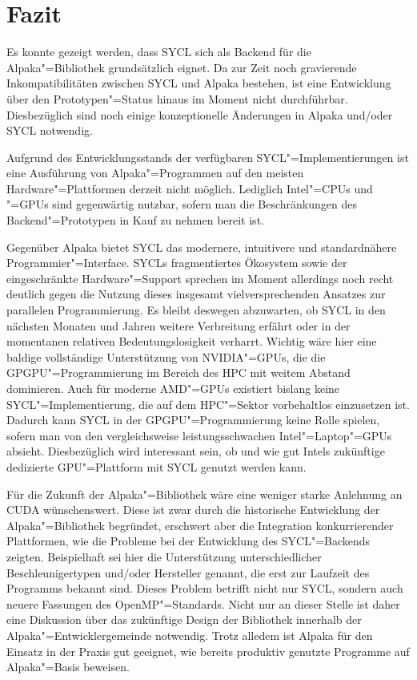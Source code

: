 \chapter{Fazit}
\label{fazit}

Es konnte gezeigt werden, dass SYCL sich als Backend für die Alpaka"=Bibliothek
grundsätzlich eignet. Da zur Zeit noch gravierende Inkompatibilitäten zwischen
SYCL und Alpaka bestehen, ist eine Entwicklung über den Prototypen"=Status hinaus
im Moment nicht durchführbar. Diesbezüglich sind noch einige konzeptionelle
Änderungen in Alpaka und/oder SYCL notwendig.

Aufgrund des Entwicklungsstands der verfügbaren SYCL"=Implementierungen ist eine
Ausführung von Alpaka"=Programmen auf den meisten Hardware"=Plattformen derzeit
nicht möglich. Lediglich Intel"=CPUs und "=GPUs sind gegenwärtig nutzbar, sofern
man die Beschränkungen des Backend"=Prototypen in Kauf zu nehmen bereit ist.

Gegenüber Alpaka bietet SYCL das modernere, intuitivere und standardnähere
Programmier"=Interface. SYCLs fragmentiertes Ökosystem sowie der eingeschränkte
Hardware"=Support sprechen im Moment allerdings noch recht deutlich gegen die
Nutzung dieses insgesamt vielversprechenden Ansatzes zur parallelen Programmierung. Es
bleibt deswegen abzuwarten, ob SYCL in den nächsten Monaten und Jahren weitere
Verbreitung erfährt oder in der momentanen relativen Bedeutungslosigkeit
verharrt. Wichtig wäre hier eine baldige vollständige Unterstützung von
NVIDIA"=GPUs, die die GPGPU"=Programmierung im Bereich des HPC mit weitem
Abstand dominieren. Auch für moderne AMD"=GPUs existiert bislang keine
SYCL"=Implementierung, die auf dem HPC"=Sektor vorbehaltlos einzusetzen ist.
Dadurch kann SYCL in der GPGPU"=Programmierung keine Rolle spielen, sofern man
von den vergleichsweise leistungsschwachen Intel"=Laptop"=GPUs absieht.
Diesbezüglich wird interessant sein, ob und wie gut Intels zukünftige dedizierte
GPU"=Plattform mit SYCL genutzt werden kann.

Für die Zukunft der Alpaka"=Bibliothek wäre eine weniger starke Anlehnung an
CUDA wünschenswert. Diese ist zwar durch die historische Entwicklung der
Alpaka"=Bibliothek begründet, erschwert aber die Integration konkurrierender
Plattformen, wie die Probleme bei der Entwicklung des SYCL"=Backends zeigten.
Beispielhaft sei hier die Unterstützung unterschiedlicher Beschleunigertypen
und/oder Hersteller genannt, die erst zur Laufzeit des Programms bekannt sind.
Dieses Problem betrifft nicht nur SYCL, sondern auch neuere Fassungen des
OpenMP"=Standards. Nicht nur an dieser Stelle ist daher eine Diskussion über das
zukünftige Design der Bibliothek innerhalb der Alpaka"=Entwicklergemeinde
notwendig. Trotz alledem ist Alpaka für den Einsatz in der Praxis gut geeignet,
wie bereits produktiv genutzte Programme auf Alpaka"=Basis beweisen.

